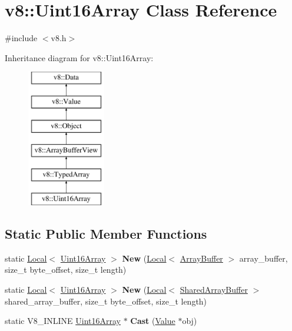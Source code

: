 \hypertarget{classv8_1_1Uint16Array}{}\section{v8\+:\+:Uint16\+Array Class Reference}
\label{classv8_1_1Uint16Array}


{\ttfamily \#include $<$v8.\+h$>$}

Inheritance diagram for v8\+:\+:Uint16\+Array\+:\begin{figure}[H]
\begin{center}
\leavevmode
\includegraphics[height=6.000000cm]{classv8_1_1Uint16Array}
\end{center}
\end{figure}
\subsection*{Static Public Member Functions}
\begin{DoxyCompactItemize}
\item 
\mbox{\label{classv8_1_1Uint16Array_aa0aafae1f5a8ce1267174391c699bd20}} 
static \mbox{\hyperlink{classv8_1_1Local}{Local}}$<$ \mbox{\hyperlink{classv8_1_1Uint16Array}{Uint16\+Array}} $>$ {\bfseries New} (\mbox{\hyperlink{classv8_1_1Local}{Local}}$<$ \mbox{\hyperlink{classv8_1_1ArrayBuffer}{Array\+Buffer}} $>$ array\+\_\+buffer, size\+\_\+t byte\+\_\+offset, size\+\_\+t length)
\item 
\mbox{\label{classv8_1_1Uint16Array_a2e3f82cf34b770742b2ca8d7486573e2}} 
static \mbox{\hyperlink{classv8_1_1Local}{Local}}$<$ \mbox{\hyperlink{classv8_1_1Uint16Array}{Uint16\+Array}} $>$ {\bfseries New} (\mbox{\hyperlink{classv8_1_1Local}{Local}}$<$ \mbox{\hyperlink{classv8_1_1SharedArrayBuffer}{Shared\+Array\+Buffer}} $>$ shared\+\_\+array\+\_\+buffer, size\+\_\+t byte\+\_\+offset, size\+\_\+t length)
\item 
\mbox{\label{classv8_1_1Uint16Array_a84b017960621903a00ef2d912233ce34}} 
static V8\+\_\+\+I\+N\+L\+I\+NE \mbox{\hyperlink{classv8_1_1Uint16Array}{Uint16\+Array}} $\ast$ {\bfseries Cast} (\mbox{\hyperlink{classv8_1_1Value}{Value}} $\ast$obj)
\end{DoxyCompactItemize}
